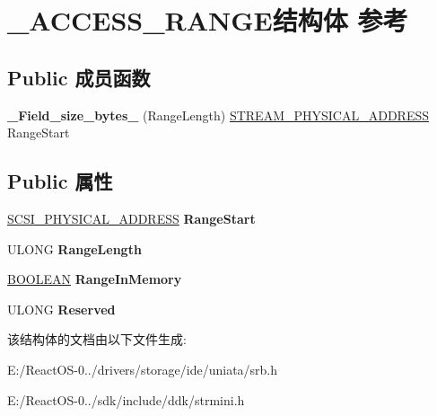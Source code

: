 \hypertarget{struct___a_c_c_e_s_s___r_a_n_g_e}{}\section{\+\_\+\+A\+C\+C\+E\+S\+S\+\_\+\+R\+A\+N\+G\+E结构体 参考}
\label{struct___a_c_c_e_s_s___r_a_n_g_e}
\subsection*{Public 成员函数}
\begin{DoxyCompactItemize}
\item 
\mbox{\label{struct___a_c_c_e_s_s___r_a_n_g_e_a69ab5bd5d4ee795519a5aad3214402f4}} 
{\bfseries \+\_\+\+Field\+\_\+size\+\_\+bytes\+\_\+} (Range\+Length) \hyperlink{union___l_a_r_g_e___i_n_t_e_g_e_r}{S\+T\+R\+E\+A\+M\+\_\+\+P\+H\+Y\+S\+I\+C\+A\+L\+\_\+\+A\+D\+D\+R\+E\+SS} Range\+Start
\end{DoxyCompactItemize}
\subsection*{Public 属性}
\begin{DoxyCompactItemize}
\item 
\mbox{\label{struct___a_c_c_e_s_s___r_a_n_g_e_ae5c9fd4da84ba2207b42d9007da2dbc1}} 
\hyperlink{union___l_a_r_g_e___i_n_t_e_g_e_r}{S\+C\+S\+I\+\_\+\+P\+H\+Y\+S\+I\+C\+A\+L\+\_\+\+A\+D\+D\+R\+E\+SS} {\bfseries Range\+Start}
\item 
\mbox{\label{struct___a_c_c_e_s_s___r_a_n_g_e_a5bdda0606dd25f7d3df6fe2371126df2}} 
U\+L\+O\+NG {\bfseries Range\+Length}
\item 
\mbox{\label{struct___a_c_c_e_s_s___r_a_n_g_e_a7904bf8fd8e20ffbf3e6834d2fcc9b22}} 
\hyperlink{_processor_bind_8h_a112e3146cb38b6ee95e64d85842e380a}{B\+O\+O\+L\+E\+AN} {\bfseries Range\+In\+Memory}
\item 
\mbox{\label{struct___a_c_c_e_s_s___r_a_n_g_e_a0348ada03ef1a748d67ec44648ba8fdd}} 
U\+L\+O\+NG {\bfseries Reserved}
\end{DoxyCompactItemize}


该结构体的文档由以下文件生成\+:\begin{DoxyCompactItemize}
\item 
E\+:/\+React\+O\+S-\/0../drivers/storage/ide/uniata/srb.\+h\item 
E\+:/\+React\+O\+S-\/0../sdk/include/ddk/strmini.\+h\end{DoxyCompactItemize}
